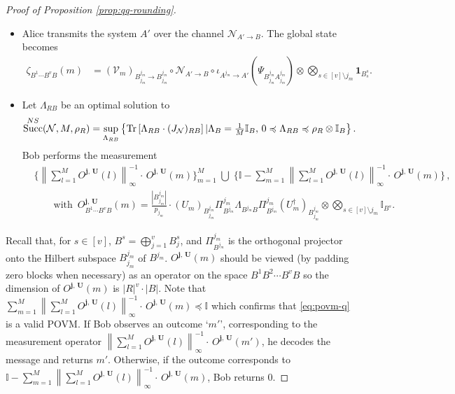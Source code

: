 \documentclass[a4paper,onecolumn,11pt,accepted=2025-10-01]{quantumarticle}
\DeclareMathOperator{\suc}{Succ}
\newcommand*{\bid}{\mathbf{1}}
\newcommand*{\dI}{\mathbb{I}}
\newcommand*{\cN}{\mathcal{N}}
\newcommand*{\cV}{\mathcal{V}}
\newcommand*{\tr}[1]{\mathrm{Tr}\left[#1\right]}
\newcommand*{\mle}{\preccurlyeq}
\begin{document}
\begin{proof}[Proof of Proposition \ref{prop:qq-rounding}]
\begin{itemize}
    \item[\textbf{Transmission.}] Alice transmits the system $A'$ over   the channel $\cN_{A'\rightarrow B}$. The global state becomes 
    \begin{align}
         \zeta_{B^1 \cdots B^{v} B}(m)
        &=(\cV_m)_{B_{j_m}^{j_m}\rightarrow B_{j_m}^{j_m}} \circ \cN_{A'\rightarrow B}\circ \iota_{A^{j_m}\rightarrow  A'}\left(\Psi_{B_{j_m}^{j_m}A_{j_m}^{j_m}}\right) \otimes \bigotimes_{s\in [v]\setminus j_m} \bid_{B^s_{s}}. 
    \end{align}
    \item[\textbf{Decoding.}] Let $\Lambda_{RB}$ be an optimal solution to 
    \begin{align}\label{eq:ns-prog-q-proof}
     \suc^{\rm{NS}}(\cN, M,  \rho_R) &=\sup_{\Lambda_{RB}} \left\{\tr{\Lambda_{RB} \cdot (J_{\cN})_{RB}} | \Lambda_B = \tfrac{1}{M}\mathbb{I}_B, \,0\mle  \Lambda_{RB} \mle \rho_R \otimes  \mathbb{I}_B   \right\}.
\end{align}
    Bob performs the measurement 
    \begin{align}
        &\bigg\{\left\|\textstyle\sum_{l=1}^M O^{\bm{j}, \, \bm{U}}(l)\right\|_{\infty}^{-1}\cdot \,  O^{\bm{j}, \, \bm{U}}(m)\bigg\}_{m=1}^M \;\bigcup\; \bigg\{\dI - \textstyle\sum_{m=1}^{M}\left\|\textstyle\sum_{l=1}^M O^{\bm{j}, \, \bm{U}}(l)\right\|_{\infty}^{-1}\cdot \,  O^{\bm{j}, \, \bm{U}}(m)\bigg\}\,, \label{eq:povm-q}
        \\ & \qquad \text{with }\,   O^{\bm{j}, \, \bm{U}}_{B^1\cdots B^{v}B}(m) = \frac{|B_{j_m}^{j_m}|}{p_{j_m}}\cdot (U_m)_{B_{j_m}^{j_m}}\Pi_{B^{j_m}}^{j_m} \Lambda_{B^{j_m} B} \Pi_{B^{j_m}}^{j_m}(U_m^\dagger)_{B_{j_m}^{j_m}} \otimes \bigotimes_{s\in [v]\setminus j_m} \dI_{B^s}.
    \end{align}
\end{itemize}



Recall that, for $s\in [v]$,  $B^s = \bigoplus_{j=1}^v B^s_j$,   and  $\Pi_{B^{j_m}}^{j_m}$ is the orthogonal projector onto the Hilbert subspace $B_{j_m}^{j_m}$ of $B^{j_m}$.  $O^{\bm{j}, \, \bm{U}}(m)$ should be viewed (by padding zero blocks when necessary) as an operator on the space $B^1B^2\cdots B^{v}B$ so  the dimension of $O^{\bm{j}, \, \bm{U}}(m)$  is  $|R|^{v} \cdot |B|$.  Note that $\textstyle\sum_{m=1}^{M}\left\|\textstyle\sum_{l=1}^M O^{\bm{j}, \, \bm{U}}(l)\right\|_{\infty}^{-1}\cdot \,  O^{\bm{j}, \, \bm{U}}(m)\mle \dI$ which confirms that \eqref{eq:povm-q} is a valid POVM. If Bob observes an outcome  `$m'$', corresponding to the measurement operator $\left\|\textstyle\sum_{l=1}^M O^{\bm{j}, \, \bm{U}}(l)\right\|_{\infty}^{-1}\cdot \,  O^{\bm{j}, \, \bm{U}}(m')$, he decodes the message and returns $m'$. Otherwise, if the outcome corresponds to  $\dI - \textstyle\sum_{m=1}^{M}\left\|\textstyle\sum_{l=1}^M O^{\bm{j}, \, \bm{U}}(l)\right\|_{\infty}^{-1}\cdot \,  O^{\bm{j}, \, \bm{U}}(m)$, Bob returns $0$. 


\end{proof}
\end{document}
